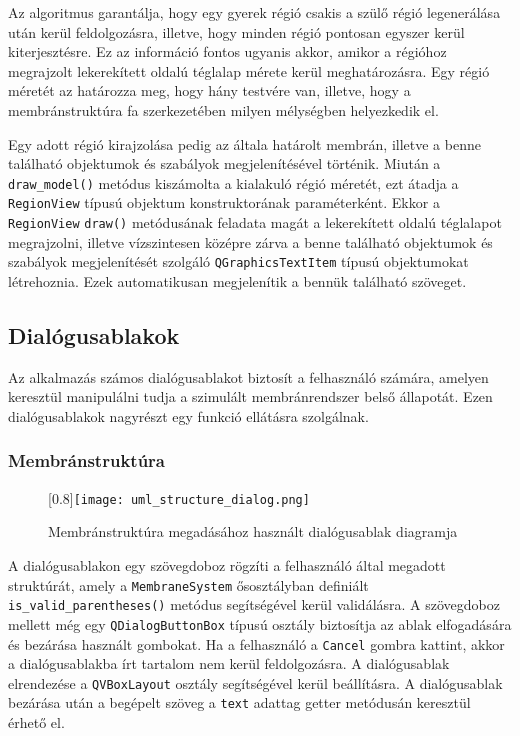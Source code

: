 Az algoritmus garantálja, hogy egy gyerek régió csakis a szülő régió legenerálása után kerül feldolgozásra, illetve, hogy minden régió pontosan egyszer kerül kiterjesztésre. Ez az információ fontos ugyanis akkor, amikor a régióhoz megrajzolt lekerekített oldalú téglalap mérete kerül meghatározásra.  Egy régió méretét az határozza meg, hogy hány testvére van, illetve, hogy a membránstruktúra fa szerkezetében milyen mélységben helyezkedik el.

Egy adott régió kirajzolása pedig az általa határolt membrán, illetve a benne található objektumok és szabályok megjelenítésével történik. Miután a \verb|draw_model()| metódus kiszámolta a kialakuló régió méretét, ezt átadja a \verb|RegionView| típusú objektum konstruktorának paraméterként. Ekkor a \verb|RegionView| \verb|draw()| metódusának feladata magát a lekerekített oldalú téglalapot megrajzolni, illetve vízszintesen középre zárva a benne található objektumok és szabályok megjelenítését szolgáló \verb|QGraphicsTextItem| típusú objektumokat létrehoznia. Ezek automatikusan megjelenítik a bennük található szöveget.

\subsection{Dialógusablakok}

Az alkalmazás számos dialógusablakot biztosít a felhasználó számára, amelyen keresztül manipulálni tudja a szimulált membránrendszer belső állapotát. Ezen dialógusablakok nagyrészt egy funkció ellátásra szolgálnak.

\subsubsection{Membránstruktúra}

\begin{figure}[H]
	\scalebox{0.8}[0.8]{\texttt{[image: uml\_structure\_dialog.png]}}
	\caption{Membránstruktúra megadásához használt dialógusablak diagramja}
	\label{fig:uml_structure}
\end{figure}

A dialógusablakon egy szövegdoboz rögzíti a felhasználó által megadott struktúrát, amely a \verb|MembraneSystem| ősosztályban definiált \verb|is_valid_parentheses()| metódus segítségével kerül validálásra. A szövegdoboz mellett még egy \verb|QDialogButtonBox| típusú osztály biztosítja az ablak elfogadására és bezárása használt gombokat. Ha a felhasználó a \verb|Cancel| gombra kattint, akkor a dialógusablakba írt tartalom nem kerül feldolgozásra. A dialógusablak elrendezése a \verb|QVBoxLayout| osztály segítségével kerül beállításra. A dialógusablak bezárása után a begépelt szöveg a \verb|text| adattag getter metódusán keresztül érhető el.


